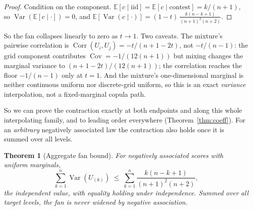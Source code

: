 \documentclass[11pt]{article}
\newtheorem{theorem}{Theorem}
\begin{document}
\begin{proof}
Condition on the component. $\mathbb E[c\mid\text{iid}]=\mathbb E[c\mid\text{contest}]=k/(n+1)$, so
$\operatorname{Var}(\mathbb E[c\mid\cdot])=0$, and $\mathbb E[\operatorname{Var}(c\mid\cdot)]=
(1-t)\,\tfrac{k(n-k+1)}{(n+1)^2(n+2)}$.
\end{proof}

So the fan collapses linearly to zero as $t\to1$. Two caveats. The mixture's pairwise
correlation is $\operatorname{Corr}(U_i,U_j)=-t/(n+1-2t)$, not $-t/(n-1)$: the grid component
contributes $\operatorname{Cov}=-1/(12(n+1))$ but mixing changes the marginal variance to
$(n+1-2t)/(12(n+1))$; the correlation reaches the floor $-1/(n-1)$ only at $t=1$. And the mixture's
one-dimensional marginal is neither continuous uniform nor discrete-grid uniform, so this is an exact
\emph{variance} interpolation, not a fixed-marginal copula path.

So we can prove the contraction exactly at both endpoints and along this whole interpolating family,
and to leading order everywhere (Theorem~\ref{thm:coeff}). For an \emph{arbitrary} negatively
associated law the contraction also holds once it is summed over all levels.

\begin{theorem}[Aggregate fan bound]\label{thm:agg}
For negatively associated scores with uniform marginals,
\begin{equation}
\sum_{k=1}^n\operatorname{Var}(U_{(k)})\;\le\;\sum_{k=1}^n\frac{k(n-k+1)}{(n+1)^2(n+2)},
\end{equation}
the independent value, with equality holding under independence. Summed over all target levels,
the fan is never widened by negative association.
\end{theorem}
\end{document}
